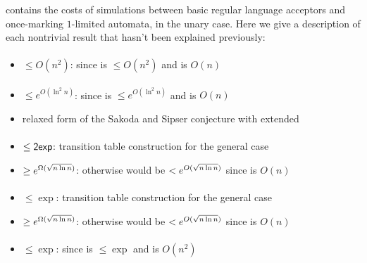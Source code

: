  contains the costs of simulations between basic regular language acceptors and once-marking $1$-limited automata, in the unary case.
Here we give a description of each nontrivial result that hasn't been explained previously:

\paragraph{\ONFA{}\tto\OMODLA}\label{cost:1NFAtoOM1DLAu}
\begin{itemize}
	\item $\le O(n^2)$: since \hyperref[cost:1NFAto2DFAu]{\ONFA{}\tto\TDFA} is $\le O(n^2)$ and \TDFA{}\tto\OMODLA is $O(n)$
\end{itemize}
\paragraph{\TNFA{}\tto\OMODLA}
\begin{itemize}
	\item $\le e^{O(\ln^2n)}$: since \hyperref[cost:2NFAto2DFAu]{\TNFA{}\tto\TDFA} is $\le e^{O(\ln^2n)}$ and \TDFA{}\tto\OMODLA is $O(n)$
	\item relaxed form of the Sakoda and Sipser conjecture with extended \TDFA
\end{itemize}
\paragraph{\OMOLA{}\tto\ODFA}
\begin{itemize}
	\item $\le\mathsf{2exp}$: transition table construction for the general case \cite{PigPis14}
	\item $\ge e^{\Omega(\sqrt{n\ln n})}$: otherwise \hyperref[cost:2DFAto1DFAu]{\TDFA{}\tto\ODFA} would be $<e^{O(\sqrt{n\ln n})}$ since \TDFA{}\tto\OMOLA is $O(n)$
\end{itemize}
\paragraph{\OMOLA{}\tto\ONFA}\label{cost:OM1LAto1NFAu}
\begin{itemize}
	\item $\le\exp$: transition table construction for the general case \cite{PigPis14}
	\item $\ge e^{\Omega(\sqrt{n\ln n})}$: otherwise \hyperref[cost:2DFAto1NFAu]{\TDFA{}\tto\ONFA} would be $<e^{O(\sqrt{n\ln n})}$ since \TDFA{}\tto\OMOLA is $O(n)$
\end{itemize}
\paragraph{\OMOLA{}\tto\TDFA}
\begin{itemize}
	\item $\le\exp$: since \hyperref[cost:OM1LAto1NFAu]{\OMOLA{}\tto\ONFA} is $\le\exp$ and \ONFA{}\tto\TDFA is $O(n^2)$
\end{itemize}
